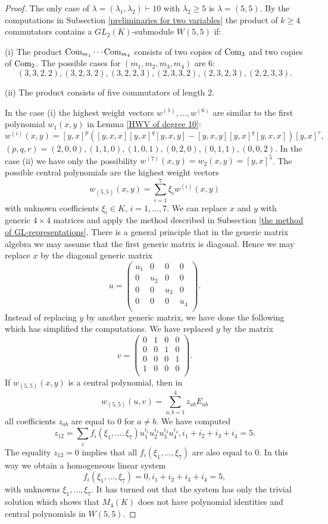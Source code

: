 \documentclass[12pt]{amsart}
\theoremstyle{definition}
\begin{document}
\begin{proof}
The only case of $\lambda=(\lambda_1,\lambda_2)\vdash 10$ with $\lambda_2\geq 5$ is $\lambda=(5,5)$.
By the computations in Subsection \ref{preliminaries for two variables}
the product of $k\geq 4$ commutators contains a $GL_2(K)$-submodule $W(5,5)$ if:

(i) The product $\text{\rm Com}_{m_1}\cdots\text{\rm Com}_{m_4}$ consists of two copies of $\text{\rm Com}_3$ and two copies of $\text{\rm Com}_2$.
The possible cases for $(m_1,m_2,m_3,m_4)$ are 6:
\[
(3,3,2,2), (3,2,3,2), (3,2,2,3), (2,3,3,2), (2,3,2,3), (2,2,3,3).
\]

(ii) The product consists of five commutators of length 2.

In the case (i) the highest weight vectors $w^{(1)},\ldots,w^{(6)}$ are similar to the first polynomial $w_1(x,y)$ in Lemma \ref{HWV of degree 10}:
\[
w^{(i)}(x,y)=[y,x]^p([y,x,x][y,x]^q[y,x,y]-[y,x,y][y,x]^q[y,x,x])[y,x]^r,
\]
$(p,q,r)=(2,0,0),(1,1,0),(1,0,1),(0,2,0),(0,1,1),(0,0,2)$.
In the case (ii) we have only the possibility $w^{(7)}(x,y)=w_2(x,y)=[y,x]^5$.
The possible central polynomials are the highest weight vectors
\[
w_{(5,5)}(x,y)=\sum_{i=1}^7\xi_iw^{(i)}(x,y)
\]
with unknown coefficients $\xi_i\in K$, $i=1,\ldots,7$. We can replace $x$ and $y$ with generic $4\times 4$ matrices
and apply the method described in Subsection \ref{the method of GL-representations}. There is a general principle
that in the generic matrix algebra we may assume that the first generic matrix is diagonal. Hence we may replace $x$ by the diagonal generic matrix
\[
u=\left(\begin{matrix}u_1&0&0&0\\
0&u_2&0&0\\
0&0&u_3&0\\
0&0&0&u_4\\
\end{matrix}\right).
\]
Instead of replacing $y$ by another generic matrix, we have done the following which has simplified the computations.
We have replaced $y$ by the matrix
\[
v=\left(\begin{matrix}0&1&0&0\\
0&0&1&0\\
0&0&0&1\\
1&0&0&0\\
\end{matrix}\right).
\]
If $w_{(5,5)}(x,y)$ is a central polynomial, then in
\[
w_{(5,5)}(u,v)=\sum_{a,b=1}^4z_{ab}E_{ab}
\]
all coefficients $z_{ab}$ are equal to 0 for $a\not=b$. We have computed
\[
z_{12}=\sum_if_i(\xi_1,\ldots,\xi_7)u_1^{i_1}u_2^{i_2}u_3^{i_3}u_4^{i_4}, i_1+i_2+i_3+i_4=5.
\]
The equality $z_{12}=0$ implies that all $f_i(\xi_1,\ldots,\xi_7)$ are also equal to 0.
In this way we obtain a homogeneous linear system
\[
f_i(\xi_1,\ldots,\xi_7)=0,i_1+i_2+i_3+i_4=5,
\]
with unknowns $\xi_1,\ldots,\xi_7$. It has turned out that the system has only the trivial solution which shows that
$M_4(K)$ does not have polynomial identities and central polynomials in $W(5,5)$.
\end{proof}
\end{document}
